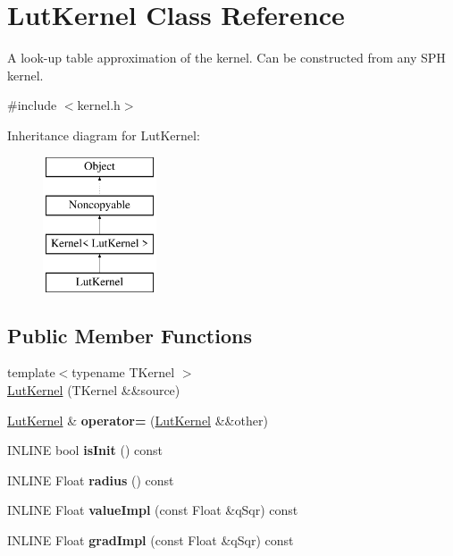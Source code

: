 \hypertarget{classLutKernel}{}\section{Lut\+Kernel Class Reference}
\label{classLutKernel}


A look-\/up table approximation of the kernel. Can be constructed from any S\+PH kernel.  




{\ttfamily \#include $<$kernel.\+h$>$}

Inheritance diagram for Lut\+Kernel\+:\begin{figure}[H]
\begin{center}
\leavevmode
\includegraphics[height=4.000000cm]{classLutKernel}
\end{center}
\end{figure}
\subsection*{Public Member Functions}
\begin{DoxyCompactItemize}
\item 
{\footnotesize template$<$typename T\+Kernel $>$ }\\\hyperlink{classLutKernel_a91a4f8b38a4b859536bcfda2140d1585}{Lut\+Kernel} (T\+Kernel \&\&source)
\item 
\hypertarget{classLutKernel_a42e116366354b4e7d919bb648dc6cd63}{}\label{classLutKernel_a42e116366354b4e7d919bb648dc6cd63} 
\hyperlink{classLutKernel}{Lut\+Kernel} \& {\bfseries operator=} (\hyperlink{classLutKernel}{Lut\+Kernel} \&\&other)
\item 
\hypertarget{classLutKernel_aa6a3fac1190441a9f598e6a8a7793e8a}{}\label{classLutKernel_aa6a3fac1190441a9f598e6a8a7793e8a} 
I\+N\+L\+I\+NE bool {\bfseries is\+Init} () const
\item 
\hypertarget{classLutKernel_af7ee74fa4adeef6771d176f046ac8ba0}{}\label{classLutKernel_af7ee74fa4adeef6771d176f046ac8ba0} 
I\+N\+L\+I\+NE Float {\bfseries radius} () const
\item 
\hypertarget{classLutKernel_a22469f5512062c4c06814f804aafa2d0}{}\label{classLutKernel_a22469f5512062c4c06814f804aafa2d0} 
I\+N\+L\+I\+NE Float {\bfseries value\+Impl} (const Float \&q\+Sqr) const
\item 
\hypertarget{classLutKernel_a60aeff7bf864f9f856ebb1872f5316e8}{}\label{classLutKernel_a60aeff7bf864f9f856ebb1872f5316e8} 
I\+N\+L\+I\+NE Float {\bfseries grad\+Impl} (const Float \&q\+Sqr) const
\end{DoxyCompactItemize}


